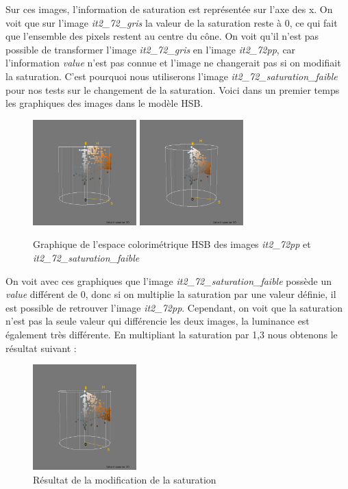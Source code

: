 \documentclass[a4paper,10pt]{article}
\begin{document}
Sur ces images, l'information de saturation est représentée sur l'axe des x. On voit que sur l'image \textit{it2\_72\_gris} la
valeur de la saturation reste à 0, ce qui fait que l'ensemble des pixels restent au centre du cône. On voit qu'il n'est pas
possible de transformer l'image \textit{it2\_72\_gris} en l'image \textit{it2\_72pp}, car l'information \textit{value} n'est pas
connue et l'image ne changerait pas si on modifiait la saturation. C'est pourquoi nous utiliserons l'image \textit{it2\_72\_saturation\_faible}
pour nos tests sur le changement de la saturation. Voici dans un premier temps les graphiques des images dans le modèle HSB.

\begin{figure}[!h]
 \begin{center}
 \includegraphics[width=4cm]{resultat/saturation1_2.png}
 \includegraphics[width=4cm]{resultat/saturation2_2.png}
 \caption{Graphique de l'espace colorimétrique HSB des images \textit{it2\_72pp} et \textit{it2\_72\_saturation\_faible}}
 \end{center}
\end{figure}
\newpage

On voit avec ces graphiques que l'image \textit{it2\_72\_saturation\_faible} possède un \textit{value} différent de 0, donc si on 
multiplie la saturation par une valeur définie, il est possible de retrouver l'image \textit{it2\_72pp}. Cependant, on voit que 
la saturation n'est pas la seule valeur qui différencie les deux images, la luminance est également très différente. En multipliant
la saturation par 1,3 nous obtenons le résultat suivant :

\begin{figure}[!h]
 \begin{center}
 \includegraphics[width=4cm]{resultat/resultat_saturation.png}
 \caption{Résultat de la modification de la saturation}
 \end{center}
\end{figure}
\end{document}
